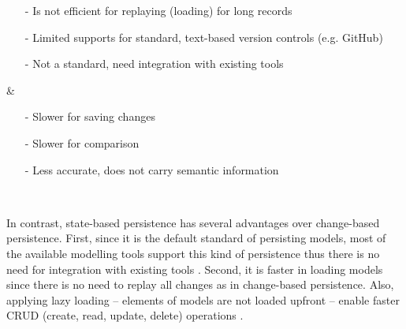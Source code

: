 \begin{table}[t!]
\begin{tabular}
\begin{minipage}[t]{7cm}
\begin{itemize}[leftmargin=9pt]
        \item[-] Is not efficient for replaying (loading) for long records \cite{mens2002state}
        \item[-] Limited supports for standard, text-based version controls (e.g. GitHub) \cite{koegel2010emfstore} 
        \item[-] Not a standard, need integration with existing tools \cite{koegel2010emfstore} 
      \end{itemize}
    \end{minipage}
    & 
    \begin{minipage}[t]{7cm}
      \raggedright
      \begin{itemize}[leftmargin=9pt]
        \setlength\itemsep{2pt}
        \item[-] Slower for saving changes  \cite{mens2002state,daniel2016neoemf,DBLP:conf/models/Espinazo-PaganCM11}
        \item[-] Slower for comparison \cite{DBLP:conf/edoc/KoegelHLHD10}
        \item[-] Less accurate, does not carry semantic information \cite{mens2002state,DBLP:conf/edoc/KoegelHLHD10}  
      \end{itemize}
    \end{minipage}
    \\
    \hline
  \end{tabular} 
\end{table}

In contrast, state-based persistence has several advantages over change-based persistence. First, since it is the default standard of persisting models, most of the available modelling tools support this kind of persistence thus there is no need for integration with existing tools \cite{koegel2010emfstore}. Second, it is faster in loading models since there is no need to replay all changes as in change-based persistence. Also, applying lazy loading -- elements of models are not loaded upfront -- enable faster CRUD (create, read, update, delete) operations \cite{DBLP:conf/models/Espinazo-PaganCM11,daniel2016neoemf}. 

